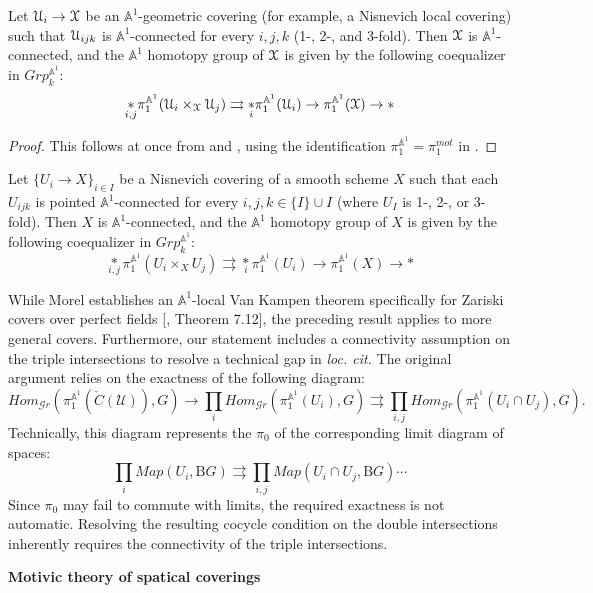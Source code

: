 \begin{cor}
Let $\EuScript{U}_i\to \EuScript{X}$ be an $\mathbb{A}^1$-geometric covering (for example, a Nisnevich local covering) such that $\EuScript{U}_{ijk}$ is $\mathbb{A}^1$-connected for every $i,j,k$ (1-, 2-, and 3-fold). Then $\EuScript{X}$ is $\mathbb{A}^1$-connected, and the $\mathbb{A}^1$ homotopy group of $\EuScript{X}$ is given by the following coequalizer in $Grp^{\mathbb{A}^1}_k$:
$$\underset{i,j}{*}\pi_1^{\mathbb{A}^1}({\EuScript{U}_i\times_\EuScript{X}\EuScript{U}_j})\rightrightarrows \underset{i}{*}\pi_1^{\mathbb{A}^1}({\EuScript{U}_i})\to \pi_1^{\mathbb{A}^1}(\EuScript{X})\to *$$
\end{cor}
\begin{proof}
    This follows at once from  and , using the identification $\pi_1^{\mathbb{A}^1}=\pi_1^{mot}$ in . 
\end{proof}
\begin{cor}
Let $\{{U}_i\to {X}\}_{i\in I}$ be a Nisnevich covering of a smooth scheme $X$ such that each ${U}_{ijk}$ is pointed $\mathbb{A}^1$-connected for every $i,j,k\in \{I\}\cup I$ (where $U_I$ is 1-, 2-, or 3-fold). Then ${X}$ is $\mathbb{A}^1$-connected, and the $\mathbb{A}^1$ homotopy group of ${X}$ is given by the following coequalizer in $Grp^{\mathbb{A}^1}_k$:
$$\underset{i,j}{*}\pi_1^{\mathbb{A}^1}({{U}_i\times_{X}{U}_j})\rightrightarrows \underset{i}{*}\pi_1^{\mathbb{A}^1}({{U}_i})\to \pi_1^{\mathbb{A}^1}({X})\to *$$
\end{cor}
\begin{rem}
While Morel establishes an $\mathbb{A}^1$-local Van Kampen theorem specifically for Zariski covers over perfect fields [\cite{morel2012a1}, Theorem 7.12], the preceding result applies to more general covers. Furthermore, our statement includes a connectivity assumption on the triple intersections to resolve a technical gap in \textit{loc. cit.} The original argument relies on the exactness of the following diagram:$$Hom_{\mathcal{G}r}(\pi_1^{\mathbb{A}^1}(\check{C}(\mathcal{U})), G) \to \prod_i Hom_{\mathcal{G}r}(\pi_1^{\mathbb{A}^1}(U_i), G) \rightrightarrows \prod_{i,j} Hom_{\mathcal{G}r}(\pi_1^{\mathbb{A}^1}(U_i \cap U_j), G).$$ Technically, this diagram represents the $\pi_0$ of the corresponding limit diagram of spaces:$$\prod_i Map(U_i,\mathrm{B} G) \rightrightarrows \prod_{i,j} Map(U_i \cap U_j,\mathrm{B} G)\cdots$$Since $\pi_0$ may fail to commute with limits, the required exactness is not automatic. Resolving the resulting cocycle condition on the double intersections inherently requires the connectivity of the triple intersections.
\end{rem} 
\textbf{Motivic theory of spatical coverings}

